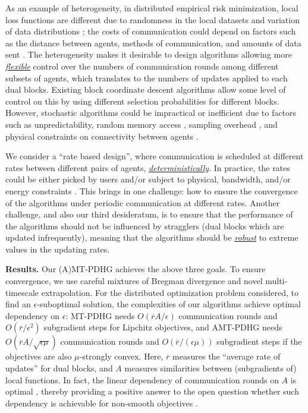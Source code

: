 \documentclass[10pt]{article}
\begin{document}
As an example of heterogeneity, in distributed empirical risk minimization, local loss functions are different due to randomness in the local datasets and variation of data distributions \cite{Zhu2016,Kovalev2022,pmlr-v32-shamir14,pmlr-v37-zhangb15,pmlr-v151-tian22b,ArjevaniShamir2015Communication}; the costs of communication could depend on factors such as the distance between agents, methods of communication, and amounts of data sent \cite{Berahas2019,BertsekasTsitsiklis1989,Scaman2019,Tyurin2024,Santosh2020}. The heterogeneity makes it desirable to design algorithms allowing more \underline{\textit{flexible}} control over the numbers of communication rounds among different subsets of agents, which translates to the numbers of updates applied to each dual blocks. Existing block coordinate descent algorithms allow some level of control on this by using different selection probabilities for different blocks. However, stochastic algorithms could be impractical or inefficient due to factors such as unpredictability, random memory access \cite{Sun2017}, sampling overhead \cite{Csiba2018}, and physical constraints on connectivity between agents \cite{Angelia2015}. 

We consider a ``rate based design'', where communication is scheduled at different rates between different pairs of agents, \underline{\textit{deterministically}}. In practice, the rates could be either picked by users and/or subject to physical, bandwidth, and/or energy constraints \cite{Zeng2021}. This brings in one challenge: how to ensure the convergence of the algorithms under periodic communication at different rates. Another challenge, and also our third desideratum, is to ensure that the performance of the algorithms should not be influenced by stragglers (dual blocks which are updated infrequently), meaning that the algorithms should be \underline{\textit{robust}} to extreme values in the updating rates. 



\textbf{Results.} Our (A)MT-PDHG achieves the above three goals. To ensure convergence, we use careful mixtures of Bregman divergence and novel multi-timescale extrapolation. For the distributed optimization problem considered, to find an $\epsilon$-suboptimal solution, the complexities of our algorithms achieve optimal dependency on $\epsilon$: MT-PDHG needs $O(\overline{r}A/\epsilon)$ communication rounds and $O(\overline{r}/\epsilon^2)$ subgradient steps for Lipchitz objectives, and AMT-PDHG needs $O(\overline{r}A/\sqrt{\epsilon\mu})$ communication rounds and $O(\overline{r}/(\epsilon\mu))$ subgradient steps if the objectives are also $\mu$-strongly convex. Here, $\overline{r}$ measures the ``average rate of updates'' for dual blocks, and $A$ measures similarities between (subgradients of) local functions. In fact, the linear dependency of communication rounds on $A$ is optimal \cite{ArjevaniShamir2015Communication}, thereby providing a positive answer to the open question whether such dependency is achievable for non-smooth objectives \cite{ArjevaniShamir2015Communication}.
\end{document}
